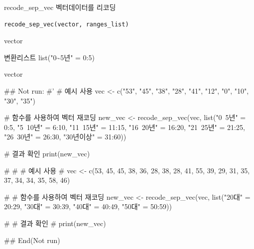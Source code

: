 \documentclass[a4paper]{book}
\begin{document}
%
\begin{Description}
recode\_sep\_vec 벡터데이터를 리코딩
\end{Description}
%
\begin{Usage}
\begin{verbatim}
recode_sep_vec(vector, ranges_list)
\end{verbatim}
\end{Usage}
%
\begin{Arguments}
\begin{ldescription}
\item[\code{vector}] vector

\item[\code{ranges\_list}] 변환리스트 list("0\textasciitilde{}5년" = 0:5)
\end{ldescription}
\end{Arguments}
%
\begin{Value}
vector
\end{Value}
%
\begin{Examples}
\begin{ExampleCode}
\#\# Not run: 
#'
# 예시 사용
vec <- c("53", "45", "38", "28", "41", "12", "0", "10", "30", "35")

# 함수를 사용하여 벡터 재코딩
new_vec <- recode_sep_vec(vec, list("0~5년" = 0:5,
                                    "5~10년" = 6:10,
                                    "11~15년" = 11:15,
                                    "16~20년" = 16:20,
                                    "21~25년" = 21:25,
                                    "26~30년" = 26:30,
                                    "30년이상" = 31:60))

# 결과 확인
print(new_vec)

# # # 예시 사용
# vec <- c(53, 45, 45, 38, 36, 28, 38, 28, 41, 55, 39, 29, 31, 35, 37, 34, 34, 35, 58, 46)

# # 함수를 사용하여 벡터 재코딩
new_vec <- recode_sep_vec(vec, list("20대" = 20:29, "30대" = 30:39, "40대" = 40:49, "50대" = 50:59))

# # 결과 확인
# print(new_vec)

## End(Not run)


\end{ExampleCode}
\end{Examples}
\end{document}
